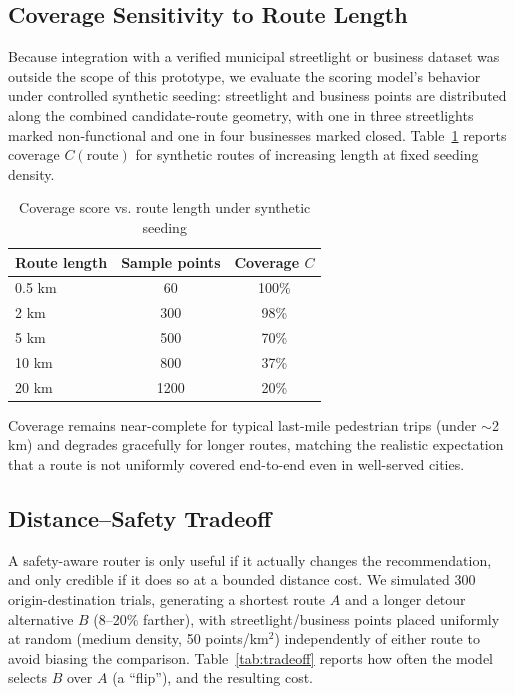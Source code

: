 \documentclass[conference]{IEEEtran}
\begin{document}
\subsection{Coverage Sensitivity to Route Length}
Because integration with a verified municipal streetlight or business dataset was outside the scope of this prototype, we evaluate the scoring model's behavior under controlled synthetic seeding: streetlight and business points are distributed along the combined candidate-route geometry, with one in three streetlights marked non-functional and one in four businesses marked closed. Table~\ref{tab:coverage} reports coverage $C(\text{route})$ for synthetic routes of increasing length at fixed seeding density.

\begin{table}[h]
\caption{Coverage score vs. route length under synthetic seeding}
\label{tab:coverage}
\centering
\begin{tabular}{@{}lcc@{}}
\toprule
\textbf{Route length} & \textbf{Sample points} & \textbf{Coverage $C$} \\
\midrule
0.5 km & 60 & 100\% \\
2 km & 300 & 98\% \\
5 km & 500 & 70\% \\
10 km & 800 & 37\% \\
20 km & 1200 & 20\% \\
\bottomrule
\end{tabular}
\end{table}

Coverage remains near-complete for typical last-mile pedestrian trips (under $\sim$2\,km) and degrades gracefully for longer routes, matching the realistic expectation that a route is not uniformly covered end-to-end even in well-served cities.

\subsection{Distance--Safety Tradeoff}
A safety-aware router is only useful if it actually changes the recommendation, and only credible if it does so at a bounded distance cost. We simulated 300 origin-destination trials, generating a shortest route $A$ and a longer detour alternative $B$ (8--20\% farther), with streetlight/business points placed uniformly at random (medium density, 50 points/km$^2$) independently of either route to avoid biasing the comparison. Table~\ref{tab:tradeoff} reports how often the model selects $B$ over $A$ (a ``flip''), and the resulting cost.
\end{document}
